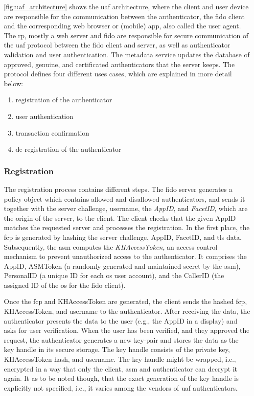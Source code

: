 \autoref{fig:uaf_architecture} shows the \gls{uaf} architecture, where the client and user device are responsible for the communication between the authenticator, the \gls{fido} client and the corresponding web browser or (mobile) app, also called the user agent. The \gls{rp}, mostly a web server and \gls{fido} are responsible for secure communication of the \gls{uaf} protocol between the \gls{fido} client and server, as well as authenticator validation and user authentication. The metadata service updates the database of approved, genuine, and certificated authenticators that the server keeps. The protocol defines four different uses cases, which are explained in more detail below:

\begin{enumerate}
	\item registration of the authenticator
	\item user authentication
	\item transaction confirmation
	\item de-registration of the authenticator
\end{enumerate}

\subsubsection{Registration}

The registration process contains different steps. The \gls{fido} server generates a policy object which contains allowed and disallowed authenticators, and sends it together with the server challenge, username, the \textit{AppID}, and \textit{FacetID}, which are the origin of the server, to the client. The client checks that the given AppID matches the requested server and processes the registration. In the first place, the \gls{fcp} is generated by hashing the server challenge, AppID, FacetID, and \gls{tls} data. Subsequently, the \gls{asm} computes the \textit{KHAccessToken}, an access control mechanism to prevent unauthorized access to the authenticator. It comprises the AppID, ASMToken (a randomly generated and maintained secret by the \gls{asm}), PersonalID (a unique ID for each \gls{os} user account), and the CallerID (the assigned ID of the \gls{os} for the \gls{fido} client).

Once the \gls{fcp} and KHAccessToken are generated, the client sends the hashed \gls{fcp}, KHAccessToken, and username to the authenticator. After receiving the data, the authenticator presents the data to the user (e.g., the AppID in a display) and asks for user verification. When the user has been verified, and they approved the request, the authenticator generates a new key-pair and stores the data as the key handle in its secure storage. The key handle consists of the private key, KHAccessToken hash, and username. The key handle might be wrapped, i.e., encrypted in a way that only the client, \gls{asm} and authenticator can decrypt it again. It as to be noted though, that the exact generation of the key handle is explicitly not specified, i.e., it varies among the vendors of \gls{uaf} authenticators.

